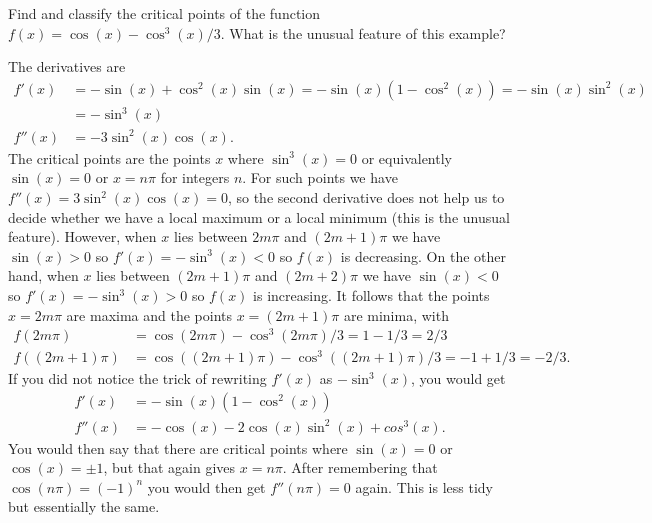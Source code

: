 \documentclass[a4paper]{amsart}
\renewenvironment{solution}{\SolutionInline}{\endSolutionInline}
\begin{document}
\begin{exercise}
 Find and classify the critical points of the function
 $f(x)=\cos(x)-\cos^3(x)/3$.  What is the unusual feature of this
 example? 
\end{exercise}
\begin{solution}
 The derivatives are 
 \begin{align*}
  f'(x) &= -\sin(x)+\cos^2(x)\sin(x) 
         = -\sin(x)(1-\cos^2(x)) 
         = -\sin(x)\sin^2(x) \\
        &= -\sin^3(x) \\
  f''(x) &= -3\sin^2(x)\cos(x).
 \end{align*}
 The critical points are the points $x$ where $\sin^3(x)=0$ or
 equivalently $\sin(x)=0$ or $x=n\pi$ for integers $n$.  For such
 points we have $f''(x)=3\sin^2(x)\cos(x)=0$, so the second derivative
 does not help us to decide whether we have a local maximum or a local
 minimum (this is the unusual feature).  However, when $x$ lies
 between $2m\pi$ and $(2m+1)\pi$ we have $\sin(x)>0$ so
 $f'(x)=-\sin^3(x)<0$ so $f(x)$ is decreasing.  On the other hand,
 when $x$ lies between $(2m+1)\pi$ and $(2m+2)\pi$ we have $\sin(x)<0$
 so $f'(x)=-\sin^3(x)>0$ so $f(x)$ is increasing.  It follows that the
 points $x=2m\pi$ are maxima and the points $x=(2m+1)\pi$ are minima,
 with
 \begin{align*}
  f(2m\pi) &= \cos(2m\pi) - \cos^3(2m\pi)/3
            = 1 - 1/3 = 2/3 \\
  f((2m+1)\pi) &= \cos((2m+1)\pi) - \cos^3((2m+1)\pi)/3
            = -1 + 1/3 = -2/3.
 \end{align*}
 If you did not notice the trick of rewriting $f'(x)$ as $-\sin^3(x)$,
 you would get 
 \begin{align*}
  f'(x) &= -\sin(x)(1-\cos^2(x)) \\
  f''(x) &= -\cos(x)-2\cos(x)\sin^2(x)+cos^3(x).
 \end{align*}
 You would then say that there are critical points where $\sin(x)=0$
 or $\cos(x)=\pm 1$, but that again gives $x=n\pi$.  After remembering
 that $\cos(n\pi)=(-1)^n$ you would then get $f''(n\pi)=0$ again.
 This is less tidy but essentially the same.


\end{solution}
\end{document}
